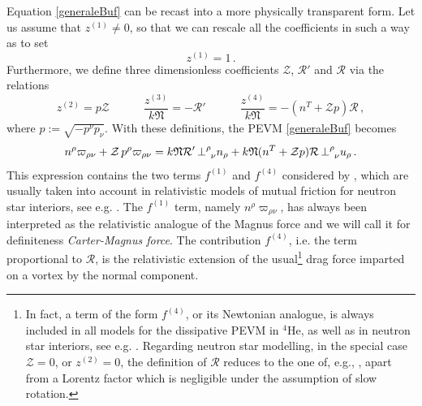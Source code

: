 \documentclass[preprints,article,accept,moreauthors,pdftex]{mdpi}
\newcommand{\spc}{\quad \quad \quad}
\begin{document}
Equation \eqref{generaleBuf} can be recast into a more physically transparent form. Let us assume that $z^{(1)} \neq 0$, so that we can rescale all the coefficients in such a way as to set
\begin{equation}
z^{(1)}=1 \, .
\end{equation}
Furthermore, we define three dimensionless coefficients $\mathcal{Z}$, $\mathcal{R}'$ and $\mathcal{R}$ via the relations
\begin{equation}
z^{(2)}=p \mathcal{Z} \spc  \dfrac{z^{(3)}}{k\mathfrak{N}}=-\mathcal{R}'  \spc \dfrac{z^{(4)}}{k\mathfrak{N}}=-(n^T+\mathcal{Z}p)\mathcal{R} \, ,
\end{equation} 
where $p:= \sqrt{-p^\nu p_\nu}$. With these definitions, the PEVM \eqref{generaleBuf} becomes
\begin{equation}
\label{persempresarai}
 n^\rho \varpi_{ \rho \nu} + \mathcal{Z}  \, p^\rho \varpi_{ \rho \nu} =  k\mathfrak{N}\mathcal{R}' \, {\perp}\indices{^\rho _\nu} n_\rho +k\mathfrak{N}(n^T+\mathcal{Z}p)\mathcal{R} \,  {\perp}\indices{^\rho _\nu} u_\rho \, .
\end{equation}
This expression contains the two terms $f^{(1)}$ and $f^{(4)}$ considered by \citet{langlois98}, which are usually taken into account in relativistic models of mutual friction for neutron star interiors, see e.g. \cite{Andersson_Mutual_Friction_2016,GavassinoGeometria}. 
The $f^{(1)}$ term, namely $ n^\rho \varpi_{ \rho \nu}$, has always been interpreted as the relativistic analogue of the Magnus force \citep{Carter_Prix_Magnus,langlois98,Andersson_Mutual_Friction_2016,GavassinoGeometria} and we will call it for definiteness \textit{Carter-Magnus force}.
The contribution $f^{(4)}$, i.e. the term proportional to $\mathcal{R}$, is the relativistic extension of the usual\footnote{
    In fact, a term of the form $f^{(4)}$, or its Newtonian analogue, is always included in all models for the dissipative PEVM in $^4$He, as well as in  neutron star interiors, see e.g. \cite{langlois98,andersson_sidery_2006,haskellsedrakian2017}. 
    Regarding neutron star modelling, in the special case $\mathcal{Z}=0$, or $z^{(2)}=0$, the definition of $\mathcal{R}$ reduces to the one of, e.g., 
    \cite{andersson_sidery_2006,Andersson_Mutual_Friction_2016,GavassinoGeometria,antonelli2020MNRAS}, 
    apart from a Lorentz factor which is negligible under the assumption of slow rotation.
}
drag force imparted on a vortex by the normal component.
\end{document}
